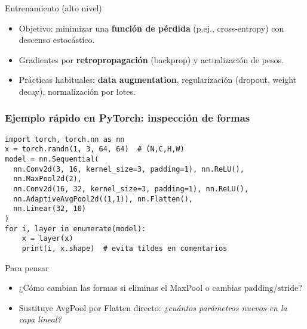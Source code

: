 \documentclass[10pt]{beamer}
\begin{document}
\begin{frame}{Entrenamiento (alto nivel)}
\begin{itemize}
  \item Objetivo: minimizar una \textbf{funci\'on de p\'erdida} (p.ej., cross-entropy) con descenso estoc\'astico.
  \item Gradientes por \textbf{retropropagaci\'on} (backprop) y actualizaci\'on de pesos.
  \item Pr\'acticas habituales: \textbf{data augmentation}, regularizaci\'on (dropout, weight decay), normalizaci\'on por lotes.
\end{itemize}
\end{frame}

\begin{frame}[fragile]
\frametitle{Ejemplo r\'apido en PyTorch: inspecci\'on de formas}
{\scriptsize
\begin{verbatim}
import torch, torch.nn as nn
x = torch.randn(1, 3, 64, 64)  # (N,C,H,W)
model = nn.Sequential(
  nn.Conv2d(3, 16, kernel_size=3, padding=1), nn.ReLU(),
  nn.MaxPool2d(2),
  nn.Conv2d(16, 32, kernel_size=3, padding=1), nn.ReLU(),
  nn.AdaptiveAvgPool2d((1,1)), nn.Flatten(),
  nn.Linear(32, 10)
)
for i, layer in enumerate(model):
    x = layer(x)
    print(i, x.shape)  # evita tildes en comentarios
\end{verbatim}
}
\vspace{-2mm}
\begin{block}{Para pensar}
\begin{itemize}
  \item ¿C\'omo cambian las formas si eliminas el MaxPool o cambias $\text{padding}$/$\text{stride}$?
  \item Sustituye AvgPool por Flatten directo: \textit{¿cu\'antos par\'ametros nuevos en la capa lineal?}
\end{itemize}
\end{block}
\end{frame}
\end{document}
